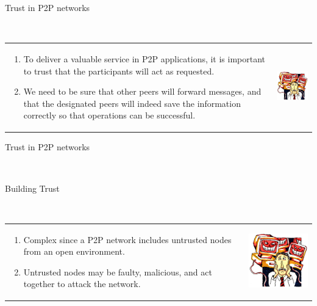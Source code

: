 \documentclass[12pt]{beamer}
\renewcommand{\frametitle}[1]{\vspace{0.2cm}\begin{huge}#1\end{huge}\\}
\renewcommand{\framesubtitle}[1]{\vspace{0.4cm} \hspace{0.4cm}\begin{large}#1\end{large}\\}
\begin{document}
  \begin{frame}
  \frametitle{Trust in P2P networks}
  \begin{table}
  \begin{tabular}{p{7cm}p{3cm}}
  \begin{enumerate}
      \item To deliver a valuable service in P2P applications, it
  is important to trust that the participants will act as requested.
      \item We need to be sure that other peers will forward
  messages, and that the designated peers will indeed save the information
  correctly so that operations can be successful.
  \end{enumerate}
  &
  \vspace{1.5cm}
  \includegraphics[width=4cm]{../../presentacion/img/malicious}\\
  \end{tabular}
  \end{table}
  \end{frame}
  
  \begin{frame}
  \frametitle{Trust in P2P networks}
  \framesubtitle{Building Trust}
  \begin{table}
  \begin{tabular}{p{7cm}p{3cm}}
  \begin{enumerate}
      \item Complex since a P2P network includes untrusted nodes from an open environment.
      \item Untrusted nodes may be faulty, malicious, and act together to attack the network.
  \end{enumerate}
  &
  \vspace{1.5cm}
  \includegraphics[width=4cm]{../../presentacion/img/malicious}\\
  \end{tabular}
  \end{table}
  \end{frame}
\end{document}

